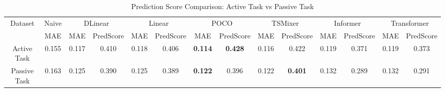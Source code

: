 \begin{table}[h!]
\centering
\caption{Prediction Score Comparison: Active Task vs Passive Task}
\label{tab:prediction_score_comparison}
\begin{tabular}{|c|c|c|c|c|c|c|c|c|c|c|c|c|c|}
\hline
\multirow{2}{*}{Dataset} & {Naive} & \multicolumn{2}{c|}{DLinear} & \multicolumn{2}{c|}{Linear} & \multicolumn{2}{c|}{POCO} & \multicolumn{2}{c|}{TSMixer} & \multicolumn{2}{c|}{Informer} & \multicolumn{2}{c|}{Transformer} \\
 & MAE & MAE & PredScore & MAE & PredScore & MAE & PredScore & MAE & PredScore & MAE & PredScore & MAE & PredScore \\
\hline
Active Task & 0.155 & 0.117 & 0.410 & 0.118 & 0.406 & \textbf{0.114} & \textbf{0.428} & 0.116 & 0.422 & 0.119 & 0.371 & 0.119 & 0.373 \\
Passive Task & 0.163 & 0.125 & 0.390 & 0.125 & 0.389 & \textbf{0.122} & 0.396 & 0.122 & \textbf{0.401} & 0.132 & 0.289 & 0.132 & 0.291 \\
\hline
\end{tabular}
\end{table}